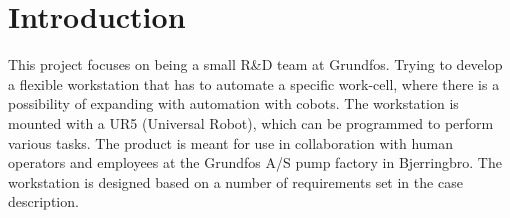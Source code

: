\chapter{Introduction} \label{ch:introduction}

This project focuses on being a small R&D team at Grundfos. Trying to develop a flexible workstation that has to automate a specific work-cell, where there is a possibility of expanding with automation with cobots. The workstation is mounted with a UR5 (Universal Robot), which can be programmed to perform various tasks. The product is meant for use in collaboration with human operators and employees at the Grundfos A/S pump factory in Bjerringbro. The workstation is designed based on a number of requirements set in the case description.\\


